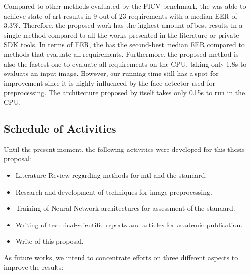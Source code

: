Compared to other methods evaluated by the FICV benchmark, the \methodname was able to achieve state-of-art results in 9 out of 23 requirements with a median EER of 3.3\%. Therefore, the proposed work has the highest amount of best results in a single method compared to all the works presented in the literature or private SDK tools. In terms of EER, the \methodname has the second-best median EER compared to methods that evaluate all requirements. Furthermore, the proposed method is also the fastest one to evaluate all requirements on the CPU, taking only 1.8s to evaluate an input image. However, our running time still has a spot for improvement since it is highly influenced by the face detector used for preprocessing. The architecture proposed by itself takes only 0.15s to run in the CPU.





\subsection{Schedule of Activities}

Until the present moment, the following activities were developed for this thesis proposal:

\begin{itemize}
\item Literature Review regarding methods for \acl{mtl} and the \icao standard.
\item Research and development of techniques for image preprocessing.
\item Training of Neural Network architectures for assessment of the \icao standard.
\item Writing of technical-scientific reports and articles for academic publication.
\item Write of this proposal.
\end{itemize}

As future works, we intend to concentrate efforts on three different aspects to improve the results:


